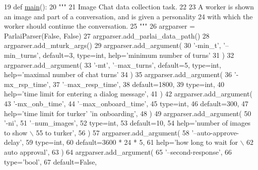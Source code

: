 \begin{DoxyCode}
19 \textcolor{keyword}{def }\hyperlink{namespaceprojects_1_1wizard__of__wikipedia_1_1mturk__evaluation__task_1_1run_ad3ab2c71f8083c3112815c0b363d316b}{main}():
20     \textcolor{stringliteral}{"""}
21 \textcolor{stringliteral}{    Image Chat data collection task.}
22 \textcolor{stringliteral}{}
23 \textcolor{stringliteral}{    A worker is shown an image and part of a conversation, and is given a personality}
24 \textcolor{stringliteral}{    with which the worker should continue the conversation.}
25 \textcolor{stringliteral}{    """}
26     argparser = ParlaiParser(\textcolor{keyword}{False}, \textcolor{keyword}{False})
27     argparser.add\_parlai\_data\_path()
28     argparser.add\_mturk\_args()
29     argparser.add\_argument(
30         \textcolor{stringliteral}{'-min\_t'}, \textcolor{stringliteral}{'--min\_turns'}, default=3, type=int, help=\textcolor{stringliteral}{'minimum number of turns'}
31     )
32     argparser.add\_argument(
33         \textcolor{stringliteral}{'-mt'}, \textcolor{stringliteral}{'--max\_turns'}, default=5, type=int, help=\textcolor{stringliteral}{'maximal number of chat turns'}
34     )
35     argparser.add\_argument(
36         \textcolor{stringliteral}{'-mx\_rsp\_time'},
37         \textcolor{stringliteral}{'--max\_resp\_time'},
38         default=1800,
39         type=int,
40         help=\textcolor{stringliteral}{'time limit for entering a dialog message'},
41     )
42     argparser.add\_argument(
43         \textcolor{stringliteral}{'-mx\_onb\_time'},
44         \textcolor{stringliteral}{'--max\_onboard\_time'},
45         type=int,
46         default=300,
47         help=\textcolor{stringliteral}{'time limit for turker'} \textcolor{stringliteral}{'in onboarding'},
48     )
49     argparser.add\_argument(
50         \textcolor{stringliteral}{'-ni'},
51         \textcolor{stringliteral}{'--num\_images'},
52         type=int,
53         default=10,
54         help=\textcolor{stringliteral}{'number of images to show \(\backslash\)}
55 \textcolor{stringliteral}{                           to turker'},
56     )
57     argparser.add\_argument(
58         \textcolor{stringliteral}{'--auto-approve-delay'},
59         type=int,
60         default=3600 * 24 * 5,
61         help=\textcolor{stringliteral}{'how long to wait for  \(\backslash\)}
62 \textcolor{stringliteral}{                           auto approval'},
63     )
64     argparser.add\_argument(
65         \textcolor{stringliteral}{'--second-response'},
66         type=\textcolor{stringliteral}{'bool'},
67         default=\textcolor{keyword}{False},

\end{DoxyCode}
